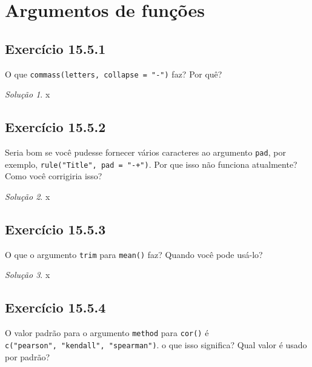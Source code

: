 \documentclass[
]{latex/krantz}
\theoremstyle{definition}
\theoremstyle{definition}
\theoremstyle{definition}
\theoremstyle{definition}
\theoremstyle{remark}
\newtheorem*{solution}{Solução}
\begin{document}
\hypertarget{argumentos-de-funuxe7uxf5es}{%
\section{Argumentos de funções}\label{argumentos-de-funuxe7uxf5es}}

\hypertarget{exr15-5-1}{%
\subsection*{Exercício 15.5.1}\label{exr15-5-1}}

O que \texttt{commass(letters,\ collapse\ =\ "-")} faz? Por quê?

\begin{solution}
x
\end{solution}

\hypertarget{exr15-5-2}{%
\subsection*{Exercício 15.5.2}\label{exr15-5-2}}

Seria bom se você pudesse fornecer vários caracteres ao argumento \texttt{pad}, por exemplo, \texttt{rule("Title",\ pad\ =\ "-+")}. Por que isso não funciona atualmente? Como você corrigiria isso?

\begin{solution}
x
\end{solution}

\hypertarget{exr15-5-3}{%
\subsection*{Exercício 15.5.3}\label{exr15-5-3}}

O que o argumento \texttt{trim} para \texttt{mean()} faz? Quando você pode usá-lo?

\begin{solution}
x
\end{solution}

\hypertarget{exr15-5-4}{%
\subsection*{Exercício 15.5.4}\label{exr15-5-4}}

O valor padrão para o argumento \texttt{method} para \texttt{cor()} é \texttt{c("pearson",\ "kendall",\ "spearman")}. o que isso significa? Qual valor é usado por padrão?
\end{document}

